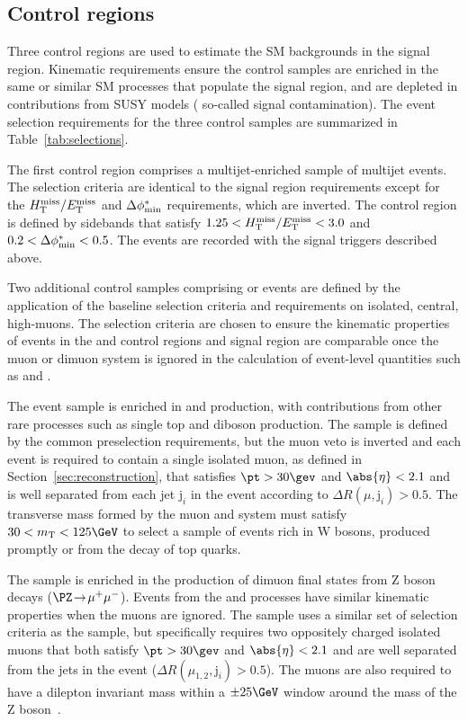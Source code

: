 \subsection{Control regions}
\label{sec:control}

Three control regions are used to estimate the SM backgrounds in the
signal region. Kinematic requirements ensure the control samples are
enriched in the same or similar SM processes that populate the signal
region, and are depleted in contributions from SUSY models (\ie
so-called signal contamination). The event selection requirements for
the three control samples are summarized in
Table~\ref{tab:selections}.

The first control region comprises a multijet-enriched sample of
multijet events. The selection criteria are identical to the signal
region requirements except for the $H_{\text{T}}^{\text{miss}} / E_{\text{T}}^{\text{miss}}$ and $\Delta\phi^{*}_\text{min}$
requirements, which are inverted. The control region is defined by
sidebands that satisfy $1.25 < H_{\text{T}}^{\text{miss}} / E_{\text{T}}^{\text{miss}} < 3.0$ and $0.2 < \Delta\phi^{*}_\text{min} <
0.5$. The events are recorded with the signal triggers described
above.

Two additional control samples comprising \mj or \mmj events are
defined by the application of the baseline selection criteria and
requirements on isolated, central, high-\pt muons. The selection
criteria are chosen to ensure the kinematic properties of events in
the \mj and \mmj control regions and signal region are comparable once
the muon or dimuon system is ignored in the calculation of event-level
quantities such as \scalht and \mht.

The \mj event sample is enriched in \wmj and \ttbar production, with
contributions from other rare processes such as single top and diboson
production. The sample is defined by the common preselection
requirements, but the muon veto is inverted and each event is required
to contain a single isolated muon, as defined in
Section~\ref{sec:reconstruction}, that satisfies $\pt > 30\gev$ and
$\abs{\eta} < 2.1$ and is well separated from each jet $\text{j}_i$
in the event according to $\Delta R(\mu,\text{j}_i) > 0.5$. The
transverse mass formed by the muon \pt and \ptvecmiss system must
satisfy $30 < m_\text{T} < 125\GeV$ to select a sample of events
rich in W bosons, produced promptly or from the decay of top quarks.

The \mmj sample is enriched in the production of dimuon final states
from Z boson decays ($\PZ\! \rightarrow\!  \mu^+\mu^-$). Events from
the \znunuj and \zmumuj processes have similar kinematic properties
when the muons are ignored. The sample uses a similar set of selection
criteria as the \mj sample, but specifically requires two oppositely
charged isolated muons that both satisfy $\pt > 30\gev$ and
$\abs{\eta} < 2.1$ and are well separated from the jets in the event
($\Delta R(\mu_{1,2},\text{j}_i) > 0.5$). The muons are also
required to have a dilepton invariant mass within a $\pm 25\GeV$
window around the mass of the Z boson~\cite{1674-1137-38-9-090001}.


